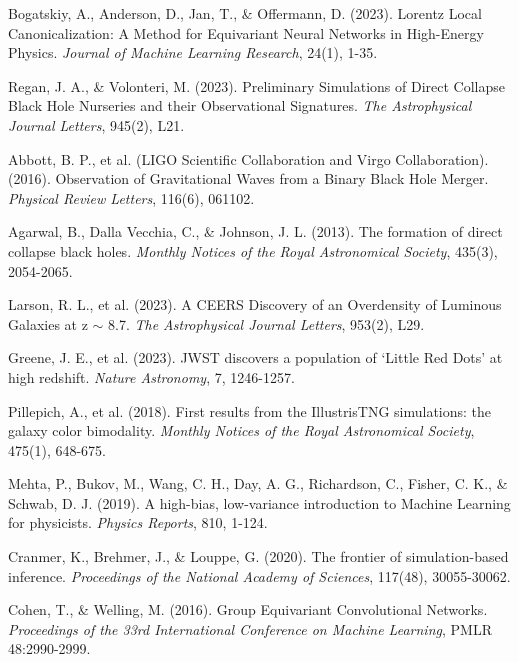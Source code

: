 \documentclass[11pt, a4paper]{article}
\begin{document}
\begin{thebibliography}{99}

Bogatskiy, A., Anderson, D., Jan, T., \& Offermann, D. (2023). Lorentz Local Canonicalization: A Method for Equivariant Neural Networks in High-Energy Physics. \textit{Journal of Machine Learning Research}, 24(1), 1-35.

Regan, J. A., \& Volonteri, M. (2023). Preliminary Simulations of Direct Collapse Black Hole Nurseries and their Observational Signatures. \textit{The Astrophysical Journal Letters}, 945(2), L21.

Abbott, B. P., et al. (LIGO Scientific Collaboration and Virgo Collaboration). (2016). Observation of Gravitational Waves from a Binary Black Hole Merger. \textit{Physical Review Letters}, 116(6), 061102.

Agarwal, B., Dalla Vecchia, C., \& Johnson, J. L. (2013). The formation of direct collapse black holes. \textit{Monthly Notices of the Royal Astronomical Society}, 435(3), 2054-2065.

Larson, R. L., et al. (2023). A CEERS Discovery of an Overdensity of Luminous Galaxies at z $\sim$ 8.7. \textit{The Astrophysical Journal Letters}, 953(2), L29.

Greene, J. E., et al. (2023). JWST discovers a population of `Little Red Dots' at high redshift. \textit{Nature Astronomy}, 7, 1246-1257.

Pillepich, A., et al. (2018). First results from the IllustrisTNG simulations: the galaxy color bimodality. \textit{Monthly Notices of the Royal Astronomical Society}, 475(1), 648-675.

Mehta, P., Bukov, M., Wang, C. H., Day, A. G., Richardson, C., Fisher, C. K., \& Schwab, D. J. (2019). A high-bias, low-variance introduction to Machine Learning for physicists. \textit{Physics Reports}, 810, 1-124.

Cranmer, K., Brehmer, J., \& Louppe, G. (2020). The frontier of simulation-based inference. \textit{Proceedings of the National Academy of Sciences}, 117(48), 30055-30062.

Cohen, T., \& Welling, M. (2016). Group Equivariant Convolutional Networks. \textit{Proceedings of the 33rd International Conference on Machine Learning}, PMLR 48:2990-2999.

\end{thebibliography}
\end{document}
